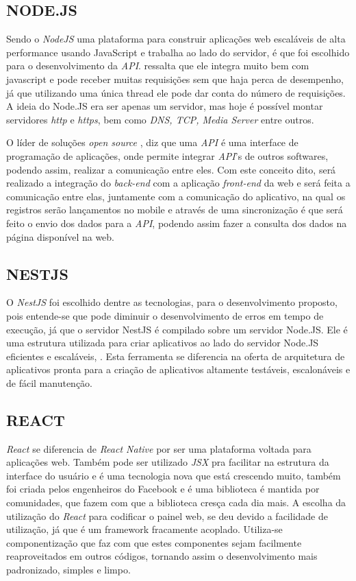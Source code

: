 \subsection{NODE.JS}
Sendo o \textit{NodeJS} uma plataforma para construir aplicações web escaláveis de alta performance usando JavaScript e trabalha ao lado do servidor, é que foi escolhido para o desenvolvimento da \textit{API}.  ressalta que ele integra muito bem com javascript e pode receber muitas requisições sem que haja perca de desempenho, já que utilizando uma única thread ele pode dar conta do número de requisições. A ideia do Node.JS era ser apenas um servidor, mas hoje é possível montar servidores \textit{http} e \textit{https}, bem como \textit{DNS, TCP, Media Server} entre outros.

O líder de soluções \textit{open source} , diz que uma \textit{API} é uma interface de programação de aplicações, onde permite integrar \textit{API}'s de outros softwares, podendo assim, realizar a comunicação entre eles. Com este conceito dito, será realizado a integração do \textit{back-end} com a aplicação \textit{front-end} da web e será feita a comunicação entre elas, juntamente com a comunicação do aplicativo, na qual os registros serão lançamentos no mobile e através de uma sincronização é que será feito o envio dos dados para a \textit{API}, podendo assim fazer a consulta dos dados na página disponível na web.

\subsection{NESTJS}
O \textit{NestJS} foi escolhido dentre as tecnologias, para o desenvolvimento proposto, pois entende-se que pode diminuir o desenvolvimento de erros em tempo de execução, já que o servidor NestJS é compilado sobre um servidor Node.JS. Ele é uma estrutura utilizada para criar aplicativos ao lado do servidor Node.JS eficientes e escaláveis, . Esta ferramenta se diferencia na oferta de arquitetura de aplicativos pronta para a criação de aplicativos altamente testáveis, escalonáveis e de fácil manutenção.

\subsection{REACT}
\textit{React} se diferencia de \textit{React Native} por ser uma plataforma voltada para aplicações web. Também pode ser utilizado \textit{JSX} pra facilitar na estrutura da interface do usuário e é uma tecnologia nova que está crescendo muito, também foi criada pelos engenheiros do Facebook e é uma biblioteca é mantida por comunidades, que fazem com que a biblioteca cresça cada dia mais. A escolha da utilização do \textit{React} para codificar o painel web, se deu devido a facilidade de utilização, já que é um framework fracamente acoplado. Utiliza-se componentização que faz com que estes componentes sejam facilmente reaproveitados em outros códigos, tornando assim o desenvolvimento mais padronizado, simples e limpo.

